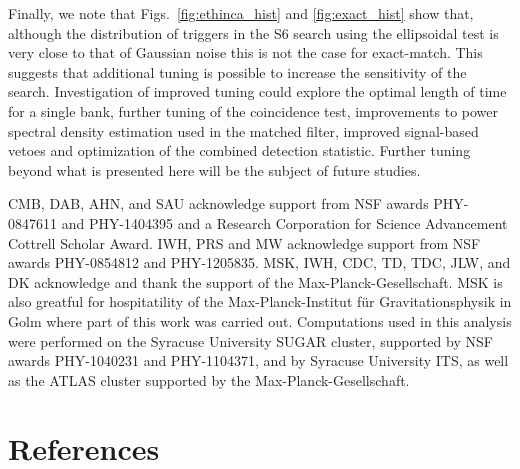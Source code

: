 \documentclass[12pt]{iopart} \usepackage{graphicx,amssymb}
\begin{document}
Finally, we note that Figs.~\ref{fig:ethinca_hist} and \ref{fig:exact_hist}
show that, although the distribution of triggers in the S6 search using the
ellipsoidal test is very close to that of Gaussian noise this is not the case
for exact-match. This suggests that additional tuning is possible to increase
the sensitivity of the search. Investigation of improved tuning could explore
the optimal length of time for a single bank, further tuning of the
coincidence test, improvements to power spectral density estimation used in
the matched filter, improved signal-based vetoes and optimization of the
combined detection statistic. Further tuning beyond what is presented here
will be the subject of future studies. 

\ack
CMB, DAB, AHN, and SAU acknowledge support from NSF awards PHY-0847611 and
PHY-1404395 and a Research Corporation for Science Advancement Cottrell
Scholar Award. IWH, PRS and MW acknowledge support from NSF awards PHY-0854812 and
PHY-1205835. MSK, IWH, CDC, TD, TDC, JLW, and DK acknowledge
and thank the support of the Max-Planck-Gesellschaft. 
MSK is also greatful for
hospitatility of the Max-Planck-Institut f{\"u}r Gravitationsphysik in Golm where part
of this work was carried out.
Computations used in this analysis were performed on the
Syracuse University SUGAR cluster, supported by NSF awards PHY-1040231 and
PHY-1104371, and by Syracuse University ITS, as well as the ATLAS cluster
supported by the Max-Planck-Gesellschaft.

\section*{References}
%


\end{document}
